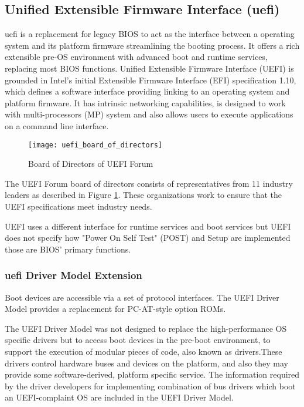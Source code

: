 \subsection{Unified Extensible Firmware Interface (\gls{uefi})}
\gls{uefi} is a replacement for legacy BIOS to act as the interface between a operating system and its platform firmware streamlining the booting process. It offers a rich extensible pre-OS environment with advanced boot and runtime services, replacing most BIOS functions. Unified Extensible Firmware Interface (UEFI) is grounded in Intel’s initial Extensible Firmware Interface (EFI) specification 1.10, which defines a software interface providing linking to an operating system and platform firmware. It has intrinsic networking capabilities,  is designed to work with multi-processors (MP) system and also allows users to execute applications on a command line interface.

\begin{figure}[h]
	\centering
	\texttt{[image: uefi\_board\_of\_directors]}
	\caption{Board of Directors of UEFI Forum \cite{uefi-board-of-directors}}\label{fig:introduction-uefi-board-of-directors}
\end{figure}

The UEFI Forum board of directors consists of representatives from 11 industry leaders as described in Figure \ref{fig:introduction-uefi-board-of-directors}. These organizations work to ensure that the UEFI specifications meet industry needs.

UEFI uses a different interface for runtime services and boot services but UEFI does not specify how "Power On Self Test" (POST) and Setup are implemented those are BIOS’ primary functions.

\subsubsection{\gls{uefi} Driver Model Extension}
Boot devices are accessible via a set of protocol interfaces. The UEFI Driver Model provides a replacement for PC-AT-style option ROMs.

The UEFI Driver Model was not designed to replace the high-performance OS specific drivers but to access boot devices in the pre-boot environment, to support the execution of modular pieces of code, also known as drivers.These drivers control hardware buses and devices on the platform, and also they may provide some software-derived, platform specific service. The information required by the driver developers for implementing combination of bus drivers which boot an UEFI-complaint OS are included in the UEFI Driver Model.

